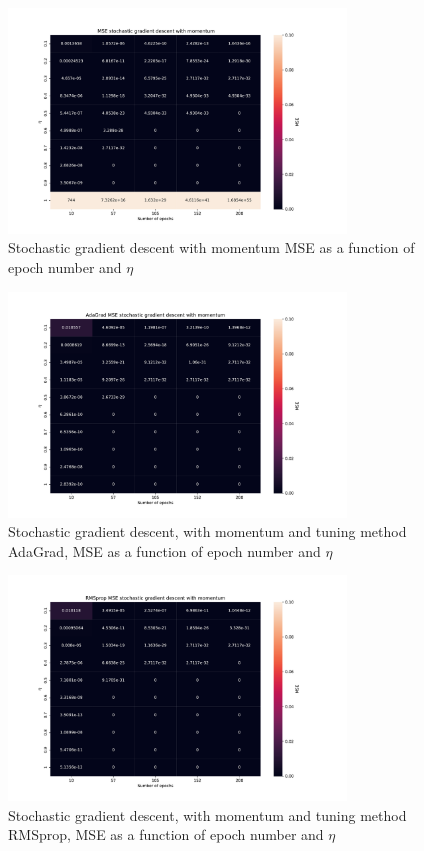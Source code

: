 \begin{figure}[H]
\centering
\includegraphics[width=0.8\textwidth]{Figures/PartA/_sgdm_MSE(eta,epochs)}
\caption{Stochastic gradient descent with momentum MSE as a function of epoch number and \(\eta \)	 }
\label{fig:_sgdm_MSE-eta-epochs-}
\end{figure}

\begin{figure}[H]
\centering
\includegraphics[width=0.8\textwidth]{Figures/PartA/AdaGrad_sgdm_MSE(eta,epochs)}
\caption{Stochastic gradient descent, with momentum and tuning method AdaGrad, MSE as a function of epoch number and \(\eta \)	 }
\label{fig:AdaGrad_sgdm_MSE-eta-epochs-}
\end{figure}

\begin{figure}[H]
\centering
\includegraphics[width=0.8\textwidth]{Figures/PartA/RMSprop_sgdm_MSE(eta,epochs)}
\caption{Stochastic gradient descent, with momentum and tuning method RMSprop, MSE as a function of epoch number and \(\eta \)	 }
\label{fig:RMSprop_sgdm_MSE-eta-epochs-}
\end{figure}

